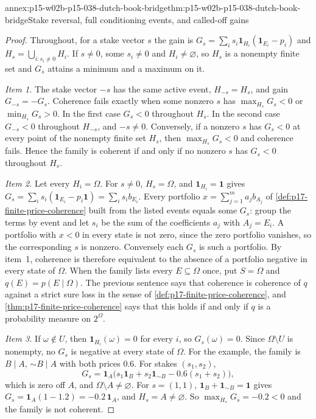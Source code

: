 \begin{annexitem}{annex:p15-w02b-p15-038-dutch-book-bridge}{thm:p15-w02b-p15-038-dutch-book-bridge}{Stake reversal, full conditioning events, and called-off gains}
\begin{proof}
Throughout, for a stake vector \(s\) the gain is
\(G_s=\sum_is_i\mathbf1_{H_i}(\mathbf1_{E_i}-p_i)\) and
\(H_s=\bigcup_{i:s_i\ne0}H_i\). If \(s\ne0\), some \(s_i\ne0\) and
\(H_i\ne\varnothing\), so \(H_s\) is a nonempty finite set and
\(G_s\) attains a minimum and a maximum on it.

\emph{Item 1.} The stake vector \(-s\) has the same active event,
\(H_{-s}=H_s\), and gain \(G_{-s}=-G_s\). Coherence fails exactly when
some nonzero \(s\) has \(\max_{H_s}G_s<0\) or \(\min_{H_s}G_s>0\).
In the first case \(G_s<0\) throughout \(H_s\). In the second case
\(G_{-s}<0\) throughout \(H_{-s}\), and \(-s\ne0\). Conversely, if a
nonzero \(s\) has \(G_s<0\) at every point of the nonempty finite set
\(H_s\), then \(\max_{H_s}G_s<0\) and coherence fails. Hence the family
is coherent if and only if no nonzero \(s\) has \(G_s<0\) throughout
\(H_s\).

\emph{Item 2.} Let every \(H_i=\Omega\). For \(s\ne0\),
\(H_s=\Omega\), and \(\mathbf1_{H_i}=\mathbf1\) gives
\(G_s=\sum_is_i(\mathbf1_{E_i}-p_i\mathbf1)=\sum_is_ib_{E_i}\). Every
portfolio \(x=\sum_{j=1}^ma_jb_{A_j}\) of
\cref{def:p17-finite-price-coherence} built from the listed events
equals some \(G_s\): group the terms by event and let \(s_i\) be the
sum of the coefficients \(a_j\) with \(A_j=E_i\). A portfolio with
\(x<0\) in every state is not zero, since the zero portfolio vanishes,
so the corresponding \(s\) is nonzero. Conversely each \(G_s\) is
such a portfolio. By item~1, coherence is therefore equivalent to the
absence of a portfolio negative in every state of \(\Omega\). When the
family lists every \(E\subseteq\Omega\) once, put \(S=\Omega\) and
\(q(E)=p(E\mid\Omega)\). The previous sentence says that coherence is
coherence of \(q\) against a strict sure loss in the sense of
\cref{def:p17-finite-price-coherence}, and
\cref{thm:p17-finite-price-coherence} says that this holds if and only
if \(q\) is a probability measure on \(2^\Omega\).

\emph{Item 3.} If \(\omega\notin U\), then
\(\mathbf1_{H_i}(\omega)=0\) for every \(i\), so \(G_s(\omega)=0\).
Since \(\Omega\setminus U\) is nonempty, no \(G_s\) is negative at
every state of \(\Omega\). For the example, the family is
\(B\mid A\), \(\sim B\mid A\) with both prices \(0.6\). For stakes
\((s_1,s_2)\),
\[
 G_s=\mathbf1_A\bigl(s_1\mathbf1_B+s_2\mathbf1_{\sim B}
        -0.6(s_1+s_2)\bigr),
\]
which is zero off \(A\), and \(\Omega\setminus A\ne\varnothing\).
For \(s=(1,1)\), \(\mathbf1_B+\mathbf1_{\sim B}=\mathbf1\) gives
\(G_s=\mathbf1_A(1-1.2)=-0.2\,\mathbf1_A\), and \(H_s=A\ne\varnothing\).
So \(\max_{H_s}G_s=-0.2<0\) and the family is not coherent.


\end{proof}
\end{annexitem}
